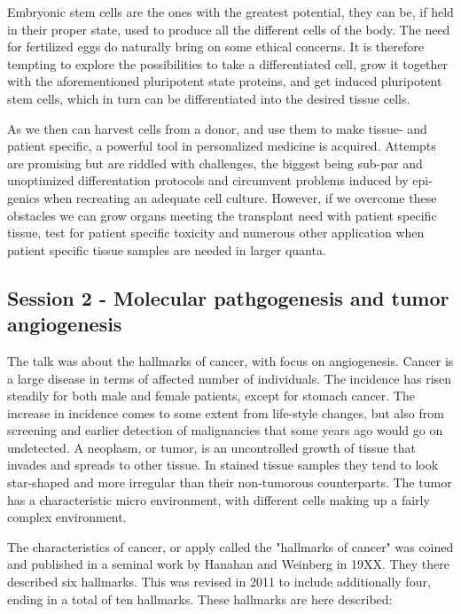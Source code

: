 \documentclass[12p]{article}
\begin{document}
Embryonic stem cells are the ones with the greatest potential, they can be, if held in their proper state, used to produce all the different cells of the body.
The need for fertilized eggs do naturally bring on some ethical concerns.
It is therefore tempting to explore the possibilities to take a differentiated cell, grow it together with the aforementioned pluripotent state proteins, and get induced pluripotent stem cells, which in turn can be differentiated into the desired tissue cells.

As we then can harvest cells from a donor, and use them to make tissue- and patient specific, a powerful tool in personalized medicine is acquired.
Attempts are promising but are riddled with challenges, the biggest being sub-par and unoptimized differentation protocols and circumvent problems induced by epi-genics when recreating an adequate cell culture.
However, if we overcome these obstacles we can grow organs meeting the transplant need with patient specific tissue, test for patient specific toxicity and numerous other application when patient specific tissue samples are needed in larger quanta.

\subsection*{Session 2 - Molecular pathgogenesis and tumor angiogenesis}

The talk was about the hallmarks of cancer, with focus on angiogenesis.
Cancer is a large disease in terms of affected number of individuals.
The incidence has risen steadily for both male and female patients, except for stomach cancer.
The increase in incidence comes to some extent from life-style changes, but also from screening and earlier detection of malignancies that some years ago would go on undetected.
A neoplasm, or tumor, is an uncontrolled growth of tissue that invades and spreads to other tissue.
In stained tissue samples they tend to look star-shaped and more irregular than their non-tumorous counterparts.
The tumor has a characteristic micro environment, with different cells making up a fairly complex environment.

The characteristics of cancer, or apply called the "hallmarks of cancer" was coined and published in a seminal work by Hanahan and Weinberg in 19XX.
They there described six hallmarks.
This was revised in 2011 to include additionally four, ending in a total of ten hallmarks.
These hallmarks are here described:
\end{document}
